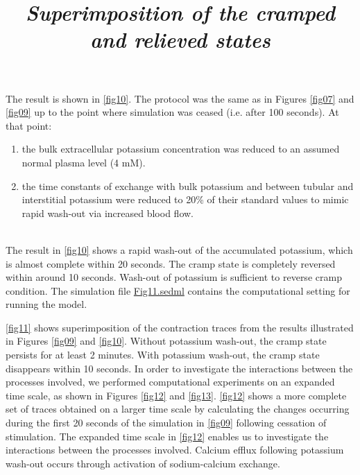 \documentclass[fleqn,10pt]{physiome}
\begin{document}
The result is shown in \autoref{fig10}. The protocol was the same as in Figures \ref{fig07} and \ref{fig09} up to the point where simulation was ceased (i.e. after 100 seconds). At that point:
\renewcommand{\labelenumi}{(\alph{enumi})}
\begin{enumerate}
     \item the bulk extracellular potassium concentration was reduced to an assumed normal plasma level (4 mM). 
     \item the time constants of exchange with bulk potassium and between tubular and interstitial potassium were reduced to 20\% of their standard values to mimic rapid wash-out via increased blood flow.
\end{enumerate}\\\newline 
The result in \autoref{fig10} shows a rapid wash-out of the accumulated potassium, which is almost complete within 20 seconds. The cramp state is completely reversed within around 10 seconds. Wash-out of potassium is sufficient to reverse cramp condition. The simulation file \href{http://models.cellml.org/workspace/5f4/file/099d70c2ee6ed5dfb1ca33e0ce16db4f0247a4dc/Fig11.sedml}{Fig11.sedml} contains the computational setting for running the model.\\


\title{\textit{Superimposition of the cramped and relieved states}}\newline


\autoref{fig11} shows superimposition of the contraction traces from the results illustrated in Figures \ref{fig09} and \ref{fig10}. Without potassium wash-out, the cramp state persists for at least 2 minutes. With potassium wash-out, the cramp state disappears within 10 seconds. In order to investigate the interactions between the processes involved, we performed computational experiments on an expanded time scale, as shown in Figures \ref{fig12} and \ref{fig13}. \autoref{fig12} shows a more complete set of traces obtained on a larger time scale by calculating the changes occurring during the first 20 seconds of the simulation in \autoref{fig09} following cessation of stimulation. The expanded time scale in \autoref{fig12} enables us to investigate the interactions between the processes involved. Calcium efflux following potassium wash-out occurs through activation of sodium-calcium exchange.\\
\end{document}
